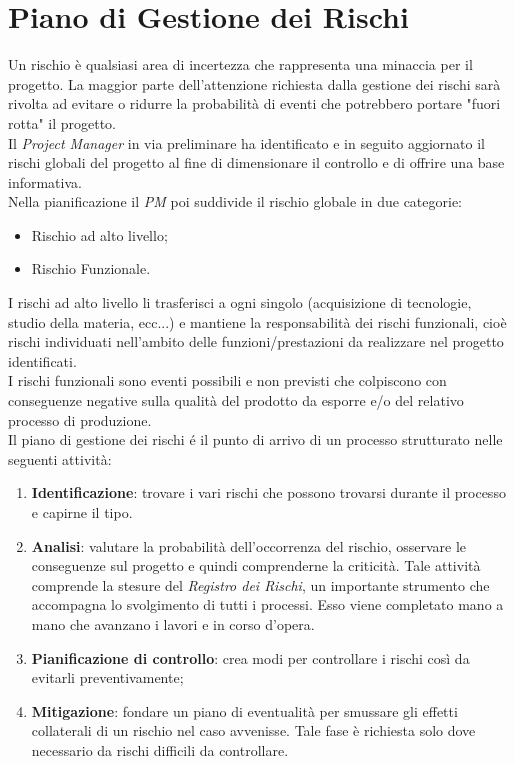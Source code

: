 \documentclass[12pt,a4paper,titlepage]{article}
\begin{document}
	\section{Piano di Gestione dei Rischi}
	Un rischio è qualsiasi area di incertezza che rappresenta una minaccia per il progetto. La maggior parte dell'attenzione richiesta dalla gestione dei rischi sarà rivolta ad evitare o ridurre la probabilità di eventi che potrebbero portare "fuori rotta" il progetto.\\
	Il \textit{Project Manager} in via preliminare ha identificato e in seguito aggiornato il rischi globali del progetto al fine di dimensionare il controllo e di offrire una base informativa.\\
	Nella pianificazione il \textit{PM} poi suddivide il rischio globale in due categorie:
	\begin{itemize}
		\item Rischio ad alto livello;
		\item Rischio Funzionale.
	\end{itemize}
	I rischi ad alto livello li trasferisci a ogni singolo (acquisizione di tecnologie, studio della materia, ecc...) e mantiene la responsabilità dei rischi funzionali, cioè rischi individuati nell'ambito delle funzioni/prestazioni da realizzare nel progetto identificati.\\
	I rischi funzionali sono eventi possibili e non previsti che colpiscono con conseguenze negative sulla qualità del prodotto da esporre e/o del relativo processo di produzione.\\
	Il piano di gestione dei rischi é il punto di arrivo di un processo strutturato nelle seguenti attività:
	\begin{enumerate}
		\item \textbf{Identificazione}: trovare i vari rischi che possono trovarsi durante il processo e capirne il tipo.
		\item \textbf{Analisi}: valutare la probabilità dell'occorrenza del rischio, osservare le conseguenze sul progetto e quindi comprenderne la criticità. Tale attività comprende la stesure del \textit{Registro dei Rischi}, un importante strumento che accompagna lo svolgimento di tutti i processi. Esso viene completato mano a mano che avanzano i lavori e in corso d'opera.
		\item \textbf{Pianificazione di controllo}: crea modi per controllare i rischi così da evitarli preventivamente;
		\item \textbf{Mitigazione}: fondare un piano di eventualità per smussare gli effetti collaterali di un rischio nel caso avvenisse. Tale fase è richiesta solo dove necessario da rischi difficili da controllare.
	\end{enumerate}
\end{document}
